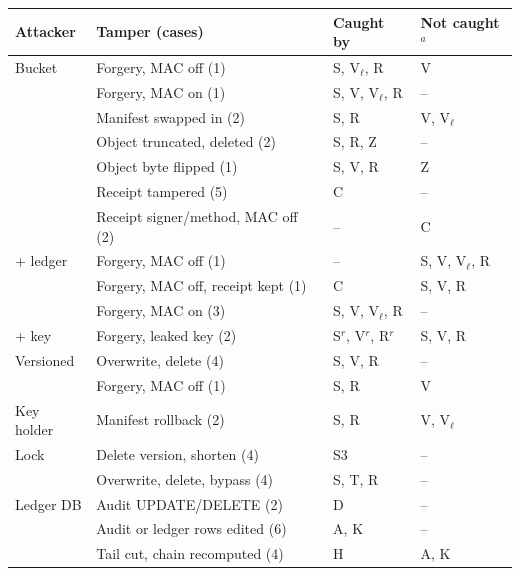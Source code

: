 
\begin{tabular}{@{}llll@{}}
\toprule
Attacker & Tamper (cases) & Caught by & Not caught$^a$ \\
\midrule
Bucket & Forgery, MAC off (1) & S, V$_\ell$, R & V \\
 & Forgery, MAC on (1) & S, V, V$_\ell$, R & -- \\
 & Manifest swapped in (2) & S, R & V, V$_\ell$ \\
 & Object truncated, deleted (2) & S, R, Z & -- \\
 & Object byte flipped (1) & S, V, R & Z \\
 & Receipt tampered (5) & C & -- \\
 & Receipt signer/method, MAC off (2) & -- & C \\
\addlinespace[1pt]
+ ledger & Forgery, MAC off (1) & -- & S, V, V$_\ell$, R \\
 & Forgery, MAC off, receipt kept (1) & C & S, V, R \\
 & Forgery, MAC on (3) & S, V, V$_\ell$, R & -- \\
\addlinespace[1pt]
+ key & Forgery, leaked key (2) & S$^r$, V$^r$, R$^r$ & S, V, R \\
\addlinespace[1pt]
Versioned & Overwrite, delete (4) & S, V, R & -- \\
 & Forgery, MAC off (1) & S, R & V \\
\addlinespace[1pt]
Key holder & Manifest rollback (2) & S, R & V, V$_\ell$ \\
\addlinespace[1pt]
Lock & Delete version, shorten (4) & S3 & -- \\
 & Overwrite, delete, bypass (4) & S, T, R & -- \\
\addlinespace[1pt]
Ledger DB & Audit UPDATE/DELETE (2) & D & -- \\
 & Audit or ledger rows edited (6) & A, K & -- \\
 & Tail cut, chain recomputed (4) & H & A, K \\
\bottomrule
\end{tabular}
